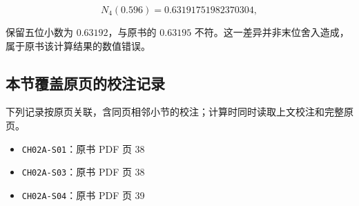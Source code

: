 \documentclass[
  10pt,
  fontset=fandol]{ctexart}
\providecommand{\tightlist}{%
  \setlength{\itemsep}{0pt}\setlength{\parskip}{0pt}}
\begin{document}
\[
N_4(0.596)=0.63191751982370304,
\]

保留五位小数为 \(0.63192\)，与原书的 \(0.63195\) 不符。这一差异并非末位舍入造成，属于原书该计算结果的数值错误。

\subsection{本节覆盖原页的校注记录}\label{ux672cux8282ux8986ux76d6ux539fux9875ux7684ux6821ux6ce8ux8bb0ux5f55}

下列记录按原页关联，含同页相邻小节的校注；计算时同时读取上文校注和完整原页。

\begin{itemize}
\tightlist
\item
  \texttt{CH02A-S01}：原书 PDF 页 38
\item
  \texttt{CH02A-S03}：原书 PDF 页 38
\item
  \texttt{CH02A-S04}：原书 PDF 页 39
\end{itemize}
\end{document}
